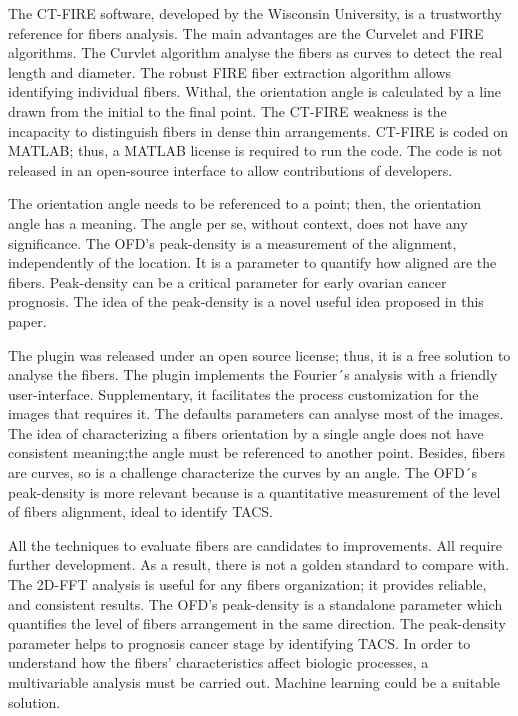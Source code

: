 \documentclass[12pt,a4paper]{article}
\begin{document}
The CT-FIRE software, developed by the Wisconsin University, is a trustworthy reference for fibers analysis. The main advantages are the Curvelet and FIRE algorithms. The Curvlet algorithm analyse the fibers as curves to detect the real length and diameter. The robust FIRE fiber extraction algorithm allows identifying individual fibers. Withal, the orientation angle is calculated by a line drawn from the initial to the final point. The CT-FIRE weakness is the incapacity to distinguish fibers in dense thin arrangements. CT-FIRE is coded on MATLAB; thus, a MATLAB license is required to run the code. The code is not released in an open-source interface to allow contributions of developers.  

The orientation angle needs to be referenced to a point; then, the orientation angle has a meaning. The angle per se, without context, does not have any significance. The OFD's peak-density is a measurement of the alignment, independently of the location. It is a parameter to quantify how aligned are the fibers. Peak-density can be a critical parameter for early ovarian cancer prognosis. The idea of the peak-density is a novel useful idea proposed in this paper. 

The plugin was released under an open source license; thus, it is a free solution to analyse the fibers. The plugin implements the Fourier´s analysis with a friendly user-interface. Supplementary, it facilitates the process customization for the images that requires it. The defaults parameters can analyse most of the images. The idea of characterizing a fibers orientation by a single angle does not have consistent meaning;the angle must be referenced to another point. Besides, fibers are curves, so is a challenge characterize the curves by an angle. The OFD´s peak-density is more relevant because is a quantitative measurement of the level of fibers alignment, ideal to identify TACS.

All the techniques to evaluate fibers are candidates to improvements. All require further development. As a result, there is not a golden standard to compare with. The 2D-FFT analysis is useful for any fibers organization; it provides reliable, and consistent results. The OFD's peak-density is a standalone parameter which quantifies the level of fibers arrangement in the same direction.  The peak-density parameter helps to prognosis cancer stage by identifying TACS. In order to understand how the fibers' characteristics affect biologic processes, a multivariable analysis must be carried out. Machine learning could be a suitable solution.
\end{document}
